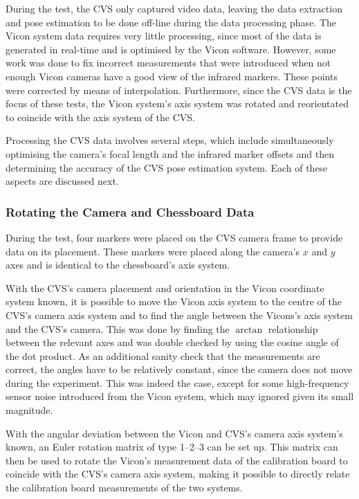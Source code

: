 During the test, the CVS only captured video data, leaving the data extraction and pose estimation to be done off-line during the data processing phase. The Vicon system data requires very little processing, since most of the data is generated in real-time and is optimised by the Vicon software. However, some work was done to fix incorrect measurements that were introduced when not enough Vicon cameras have a good view of the infrared markers. These points were corrected by means of interpolation. Furthermore, since the CVS data is the focus of these tests, the Vicon system's axis system was rotated and reorientated to coincide with the axis system of the CVS.\@

Processing the CVS data involves several steps, which include simultaneously optimising the camera's focal length and the infrared marker offsets and then determining the accuracy of the CVS pose estimation system. Each of these aspects are discussed next.

\subsubsection{Rotating the Camera and Chessboard Data}
\label{sec:rotate-axes}

During the test, four markers were placed on the CVS camera frame to provide data on its placement. These markers were placed along the camera's $x$ and $y$ axes and is identical to the chessboard's axis system. 

With the CVS's camera placement and orientation in the Vicon coordinate system known, it is possible to move the Vicon axis system to the centre of the CVS's camera axis system and to find the angle between the Vicons's axis system and the CVS's camera. This was done by finding the $\arctan$ relationship between the relevant axes and was double checked by using the cosine angle of the dot product. As an additional sanity check that the measurements are correct, the angles have to be relatively constant, since the camera does not move during the experiment. This was indeed the case, except for some high-frequency sensor noise introduced from the Vicon system, which may ignored given its small magnitude. 

With the angular deviation between the Vicon and CVS's camera axis system's known, an Euler rotation matrix of type 1--2--3 can be set up. This matrix can then be used to rotate the Vicon's measurement data of the calibration board to coincide with the CVS's camera axis system, making it possible to directly relate the calibration board measurements of the two systems. 

